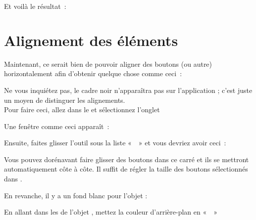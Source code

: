 
Et voilà le résultat : 



\section{Alignement des éléments}

Maintenant, ce serait bien de pouvoir aligner des boutons (ou autre)
horizontalement afin d'obtenir quelque  chose comme ceci :


Ne vous inquiétez pas, le cadre noir n’apparaîtra pas sur l'application ; c'est juste un moyen de distinguer les alignements. \\

Pour faire ceci, allez dans le  et sélectionnez l'onglet 


Une fenêtre comme ceci apparaît :


Ensuite, faites glisser l'outil 
sous la liste «  » et vous devriez avoir ceci :


Vous pouvez dorénavant faire glisser des boutons dans ce carré et ils se mettront automatiquement côte à côte. Il suffit de régler la taille des boutons sélectionnés dans .




En revanche, il y a un fond blanc pour l'objet :


En allant dans les  de l'objet , mettez la couleur d'arrière-plan en «  »

